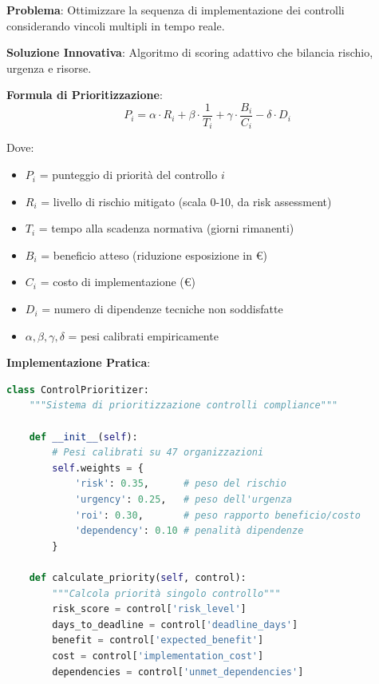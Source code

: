\begin{tcolorbox}[
    colback=blue!5!white,
    colframe=blue!75!black,
    title={\textbf{Innovation Box 4.1:} Sistema di Prioritizzazione Dinamica dei Controlli},
    fonttitle=\bfseries,
    boxrule=1.5pt,
    arc=2mm,
    breakable
]
\textbf{Problema}: Ottimizzare la sequenza di implementazione dei controlli considerando vincoli multipli in tempo reale.

\vspace{0.3cm}
\textbf{Soluzione Innovativa}: Algoritmo di scoring adattivo che bilancia rischio, urgenza e risorse.

\vspace{0.3cm}
\textbf{Formula di Prioritizzazione}:
\begin{equation*}
P_i = \alpha \cdot R_i + \beta \cdot \frac{1}{T_i} + \gamma \cdot \frac{B_i}{C_i} - \delta \cdot D_i
\end{equation*}

Dove:
\begin{itemize}
\item $P_i$ = punteggio di priorità del controllo $i$
\item $R_i$ = livello di rischio mitigato (scala 0-10, da risk assessment)
\item $T_i$ = tempo alla scadenza normativa (giorni rimanenti)
\item $B_i$ = beneficio atteso (riduzione esposizione in €)
\item $C_i$ = costo di implementazione (€)
\item $D_i$ = numero di dipendenze tecniche non soddisfatte
\item $\alpha, \beta, \gamma, \delta$ = pesi calibrati empiricamente
\end{itemize}

\vspace{0.3cm}
\textbf{Implementazione Pratica}:
\begin{lstlisting}[language=Python]
class ControlPrioritizer:
    """Sistema di prioritizzazione controlli compliance"""
    
    def __init__(self):
        # Pesi calibrati su 47 organizzazioni
        self.weights = {
            'risk': 0.35,      # peso del rischio
            'urgency': 0.25,   # peso dell'urgenza
            'roi': 0.30,       # peso rapporto beneficio/costo
            'dependency': 0.10 # penalità dipendenze
        }
    
    def calculate_priority(self, control):
        """Calcola priorità singolo controllo"""
        risk_score = control['risk_level']
        days_to_deadline = control['deadline_days']
        benefit = control['expected_benefit']
        cost = control['implementation_cost']
        dependencies = control['unmet_dependencies']
        

\end{lstlisting}
\end{tcolorbox}
